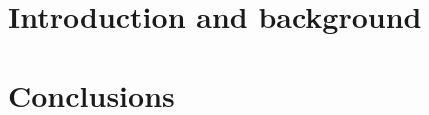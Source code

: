 




\renewcommand*{\chapterpagestyle}{empty}


\renewcommand*{\chapterpagestyle}{plain}
\cleardoublepage
\pagestyle{plain}

\renewcommand{\BrainFuckChapter}{
}

{}

\tableofcontents

\renewcommand{\BrainFuckChapter}{
}
\listoffigures

\renewcommand{\BrainFuckChapter}{
}





\cleardoublepage

\acresetall{}
\renewcommand*{\chapterpagestyle}{scrheadings}

\pagestyle{scrheadings}
% 

\part{Introduction and background}
\label{part:intro_background}





\part{Conclusions}
\label{part:conclusion}

% 
\begin{appendix}
  
  
\end{appendix}
\DeclareRobustCommand{\van}[3]{#2 #1}

\renewcommand{\bibname}{References}


\renewcommand{\BrainFuckChapter}{}
\ifx\finalversion\undefined
\listoftodos
\fi
%


